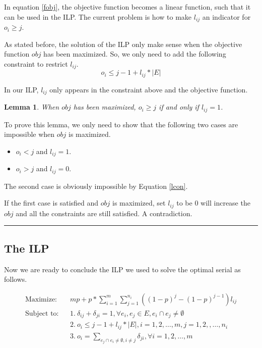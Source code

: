 \documentclass[letterpaper]{article}
\newenvironment{proof}{{Proof:}}{\hfill\rule{2mm}{2mm}}
\newtheorem{lemma}{Lemma}
\begin{document}
In equation \ref{fobj}, the objective function becomes a linear function, such that it can be used in the ILP.
The current problem is how to make $l_{ij}$ an indicator for $o_i\geq j$.

As stated before, the solution of the ILP only make sense when the objective function $obj$ has been maximized.
So, we only need to add the following constraint to restrict $l_{ij}$.
\begin{equation}
o_i\leq j-1+l_{ij}*|E|\label{lcon}
\end{equation}

In our ILP, $l_{ij}$ only appears in the constraint above and the objective function.

\begin{lemma}\label{lmm}
	When $obj$ has been maximized, $o_i\geq j$ if and only if $l_{ij}=1$.
\end{lemma}
\begin{proof}
	To prove this lemma, we only need to show that the following two cases are impossible when $obj$ is maximized.
	\begin{itemize}
		\item $o_i<j$ and $l_{ij}=1$.
		\item $o_i>j$ and $l_{ij}=0$.
	\end{itemize}
	The second case is obviously impossible by Equation \ref{lcon}.
	
	If the first case is satisfied and $obj$ is maximized, set $l_{ij}$ to be 0 will increase the $obj$ and all the constraints are still satisfied. A contradiction.
\end{proof}

\subsection{The ILP}
Now we are ready to conclude the ILP we used to solve the optimal serial as follows.

\begin{eqnarray}
\text{Maximize:}&& mp+p*\sum_{i=1}^{m}\sum_{j=1}^{n_i}((1-p)^j-(1-p)^{j-1})l_{ij}\nonumber\\
\text{Subject to:}&& 1.~\delta_{ij}+\delta_{ji}=1, \forall e_i,e_j\in E, e_i\cap e_j\neq \emptyset \label{con1}\\
&& 2.~o_i\leq j-1+l_{ij}*|E|,  i=1,2,\ldots,m, j=1,2,,\ldots,n_i\label{ni}\\
&& 3.~o_i=\sum_{e_j\cap e_i\neq \emptyset,i\neq j}\delta_{ji}, \forall i=1,2,\ldots,m \label{oo}
\end{eqnarray}
\end{document}
